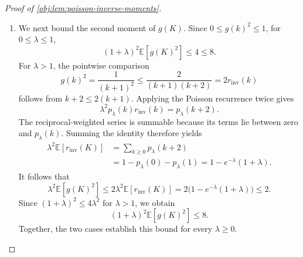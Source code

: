 \begin{proof}[Proof of \cref{obj:lem:poisson-inverse-moments}]
\begin{enumerate}
Cauchy--Schwarz and expansion of the squares give
\[
\left|
\mathbb E[f_{\mathrm{aux},N_{\mathrm{cut}}}(K)]
-\mathbb E[f_{\mathrm{aux}}(K)]
\right|
\le
\sqrt{\mathbb E\bigl[(e^{\mathrm{val}}_{N_{\mathrm{cut}}}(K))^2\bigr]},
\]
\[
\begin{aligned}
&\left|
\mathbb E[f_{\mathrm{aux},N_{\mathrm{cut}}}(K)^2]
-\mathbb E[f_{\mathrm{aux}}(K)^2]
\right|\\
&\quad\le
\mathbb E\bigl[(e^{\mathrm{val}}_{N_{\mathrm{cut}}}(K))^2\bigr]
+2\sqrt{
\mathbb E[f_{\mathrm{aux}}(K)^2]\,
\mathbb E\bigl[(e^{\mathrm{val}}_{N_{\mathrm{cut}}}(K))^2\bigr]},
\end{aligned}
\]
and
\[
\begin{aligned}
&\left|
\mathbb E[(\Delta f_{\mathrm{aux},N_{\mathrm{cut}}}(K))^2]
-\mathbb E[(\Delta f_{\mathrm{aux}}(K))^2]
\right|\\
&\quad\le
\mathbb E\bigl[(e^{\mathrm{inc}}_{N_{\mathrm{cut}}}(K))^2\bigr]
+2\sqrt{
\mathbb E[(\Delta f_{\mathrm{aux}}(K))^2]\,
\mathbb E\bigl[(e^{\mathrm{inc}}_{N_{\mathrm{cut}}}(K))^2\bigr]}.
\end{aligned}
\]
Hence both the variance and the expected squared increment of the truncations converge to those of \(f_{\mathrm{aux}}\). Passing to the limit in the finite-support inequality proves
\[
\operatorname{Var}(f_{\mathrm{aux}}(K))
\le\lambda\,\mathbb E[(\Delta f_{\mathrm{aux}}(K))^2].
\]
Applying this to \(g\), with the square-integrability established above, gives
\[
\operatorname{Var}(g(K))
\le\lambda\,\mathbb E[r_{\mathrm{inv}}(K)^2].
\] %

\item We next bound the second moment of \(g(K)\). Since \(0\le g(k)^2\le1\), for \(0\le\lambda\le1\),
\[
(1+\lambda)^2\mathbb E[g(K)^2]\le4\le8.
\]
For \(\lambda>1\), the pointwise comparison
\[
g(k)^2=\frac1{(k+1)^2}
\le\frac2{(k+1)(k+2)}
=2r_{\mathrm{inv}}(k)
\]
follows from \(k+2\le2(k+1)\). Applying the Poisson recurrence twice gives
\[
\lambda^2p_\lambda(k)r_{\mathrm{inv}}(k)=p_\lambda(k+2).
\]
The reciprocal-weighted series is summable because its terms lie between zero and \(p_\lambda(k)\). Summing the identity therefore yields
\[
\begin{aligned}
\lambda^2\mathbb E[r_{\mathrm{inv}}(K)]
&=\sum_{k\ge0}p_\lambda(k+2)\\
&=1-p_\lambda(0)-p_\lambda(1)
=1-e^{-\lambda}(1+\lambda).
\end{aligned}
\]
It follows that
\[
\lambda^2\mathbb E[g(K)^2]
\le2\lambda^2\mathbb E[r_{\mathrm{inv}}(K)]
=2\bigl(1-e^{-\lambda}(1+\lambda)\bigr)
\le2.
\]
Since \((1+\lambda)^2\le4\lambda^2\) for \(\lambda>1\), we obtain
\[
(1+\lambda)^2\mathbb E[g(K)^2]\le8.
\]
Together, the two cases establish this bound for every \(\lambda\ge0\). %


\end{enumerate}
\end{proof}
